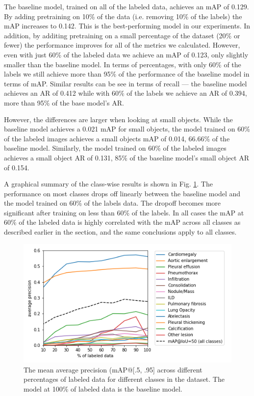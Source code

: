 \documentclass[conference]{IEEEtran}
\begin{document}
The baseline model, trained on all of the labeled data, achieves an mAP of 0.129. By adding pretraining on 10\% of the data (i.e. removing 10\% of the labels) the mAP increases to 0.142. This is the best-performing model in our experiments. In addition, by additing pretraining on a small percentage of the dataset (20\% or fewer) the performance improves for all of the metrics we calculated. However, even with just 60\% of the labeled data we achieve an mAP of 0.123, only slightly smaller than the baseline model. In terms of percentages, with only 60\% of the labels we still achieve more than 95\% of the performance of the baseline model in terms of mAP. Similar results can be see in terms of recall — the baseline model achieves an AR of 0.412 while with 60\% of the labels we achieve an AR of 0.394, more than 95\% of the base model's AR.

However, the differences are larger when looking at small objects. While the baseline model achieves a 0.021 mAP for small objects, the model trained on 60\% of the labeled images achieves a small objects mAP of 0.014, 66.66\% of the baseline model. Similarly, the model trained on 60\% of the labeled images achieves a small object AR of 0.131, 85\% of the baseline model's small object AR of 0.154.

A graphical summary of the class-wise results is shown in Fig. \ref{fig:classwise-map}. The performance on most classes drops off linearly between the baseline model and the model trained on 60\% of the labels data. The dropoff becomes more significant after training on less than 60\% of the labels. In all cases the mAP at 60\% of the labeled data is highly correlated with the mAP across all classes as described earlier in the section, and the same conclusions apply to all classes.

\begin{figure}[h]
\centering
\includegraphics[width=\columnwidth]{images/map_graph}
\caption{The mean average precision (mAP@[.5, .95] across different percentages of labeled data for different classes in the dataset. The model at 100\% of labeled data is the baseline model.}
\label{fig:classwise-map}
\end{figure}
\end{document}
